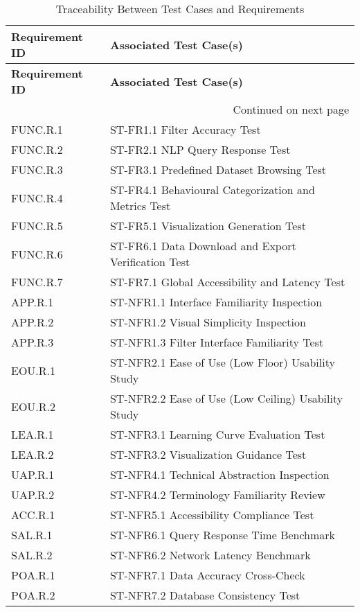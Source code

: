 \documentclass[12pt, titlepage]{article}
\begin{document}
\renewcommand{\arraystretch}{1.2}
\begin{longtable}{|l|p{10cm}|}
\caption{Traceability Between Test Cases and Requirements}
\label{tab:traceability} \\
\hline
\textbf{Requirement ID} & \textbf{Associated Test Case(s)} \\
\hline
\endfirsthead
\hline
\textbf{Requirement ID} & \textbf{Associated Test Case(s)} \\
\hline
\endhead
\hline \multicolumn{2}{r}{{Continued on next page}} \\
\endfoot
\hline
\endlastfoot

FUNC.R.1 & ST-FR1.1 Filter Accuracy Test \\
FUNC.R.2 & ST-FR2.1 NLP Query Response Test \\
FUNC.R.3 & ST-FR3.1 Predefined Dataset Browsing Test \\
FUNC.R.4 & ST-FR4.1 Behavioural Categorization and Metrics Test \\
FUNC.R.5 & ST-FR5.1 Visualization Generation Test \\
FUNC.R.6 & ST-FR6.1 Data Download and Export Verification Test \\
FUNC.R.7 & ST-FR7.1 Global Accessibility and Latency Test \\
APP.R.1 & ST-NFR1.1 Interface Familiarity Inspection \\
APP.R.2 & ST-NFR1.2 Visual Simplicity Inspection \\
APP.R.3 & ST-NFR1.3 Filter Interface Familiarity Test \\
EOU.R.1 & ST-NFR2.1 Ease of Use (Low Floor) Usability Study \\
EOU.R.2 & ST-NFR2.2 Ease of Use (Low Ceiling) Usability Study \\
LEA.R.1 & ST-NFR3.1 Learning Curve Evaluation Test \\
LEA.R.2 & ST-NFR3.2 Visualization Guidance Test \\
UAP.R.1 & ST-NFR4.1 Technical Abstraction Inspection \\
UAP.R.2 & ST-NFR4.2 Terminology Familiarity Review \\
ACC.R.1 & ST-NFR5.1 Accessibility Compliance Test \\
SAL.R.1 & ST-NFR6.1 Query Response Time Benchmark \\
SAL.R.2 & ST-NFR6.2 Network Latency Benchmark \\
POA.R.1 & ST-NFR7.1 Data Accuracy Cross-Check \\
POA.R.2 & ST-NFR7.2 Database Consistency Test \\

\end{longtable}
\end{document}
